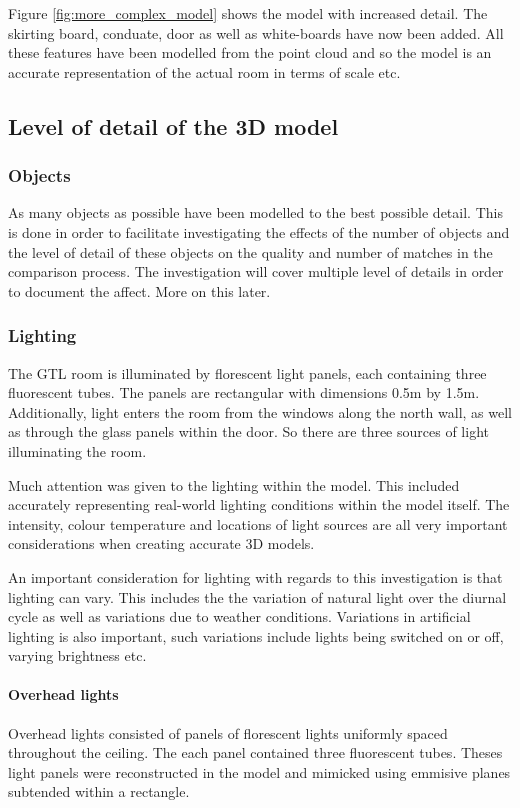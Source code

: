 \documentclass[11pt,a4paper]{report}
\begin{document}
				Figure \ref{fig:more_complex_model} shows the model with increased detail. The skirting board, conduate, door as well as white-boards have now been added. All these features have been modelled from the point cloud and so the model is an accurate representation of the actual room in terms of scale etc.
				
		\subsection{Level of detail of the 3D model}
			\subsubsection{Objects}
				As many objects as possible have been modelled to the best possible detail. This is done in order to facilitate investigating the effects of the number of objects and the level of detail of these objects on the quality and number of matches in the comparison process. The investigation will cover multiple level of details in order to document the affect. More on this later.
				
			\subsubsection{Lighting}
				The GTL room is illuminated by florescent light panels, each containing three fluorescent tubes. The panels are rectangular with dimensions 0.5m by 1.5m. Additionally, light enters the room from the windows along the north wall, as well as through the glass panels within the door. So there are three sources of light illuminating the room.
			
				Much attention was given to the lighting within the model. This included accurately representing real-world lighting conditions within the model itself. The intensity, colour temperature and locations of light sources are all very important considerations when creating accurate 3D models.
				
				An important consideration for lighting with regards to this investigation is that lighting can vary. This includes the the variation of natural light over the diurnal cycle as well as variations due to weather conditions. Variations in artificial lighting is also important, such variations include lights being switched on or off, varying brightness etc.
				
				\paragraph{Overhead lights}
					Overhead lights consisted of panels of florescent lights uniformly spaced throughout the ceiling. The each panel contained three fluorescent tubes. Theses light panels were reconstructed in the model and mimicked using emmisive planes subtended within a rectangle.
					
\end{document}
